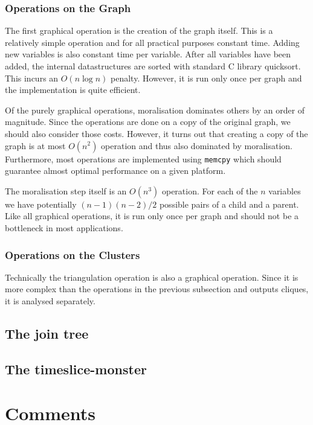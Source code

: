 \documentclass[12pt,a4paper]{report}
\newcommand{\examplecode}[1]{\texttt{#1}}
\begin{document}
\subsection{Operations on the Graph}

The first graphical operation is the creation of the graph
itself. This is a relatively simple operation and for all practical
purposes constant time. Adding new variables is also constant time per
variable. After all variables have been added, the internal
datastructures are sorted with standard C library quicksort. This
incurs an $O(n \log n)$ penalty. However, it is run only once per
graph and the implementation is quite efficient.

Of the purely graphical operations, moralisation dominates others by
an order of magnitude. Since the operations are done on a copy of the
original graph, we should also consider those costs. However, it turns
out that creating a copy of the graph is at most $O(n^2)$ operation
and thus also dominated by moralisation. Furthermore, most operations
are implemented using \examplecode{memcpy} which should guarantee
almost optimal performance on a given platform.

The moralisation step itself is an $O(n^3)$ operation. For each of the
$n$ variables we have potentially $(n-1)(n-2)/2$ possible pairs of a
child and a parent. Like all graphical operations, it is run only once
per graph and should not be a bottleneck in most applications.

\subsection{Operations on the Clusters}

Technically the triangulation operation is also a graphical
operation. Since it is more complex than the operations in the
previous subsection and outputs cliques, it is analysed separately.





\section{The join tree}

\section{The timeslice-monster}


\newpage
\chapter{Comments}


\newpage

\end{document}
